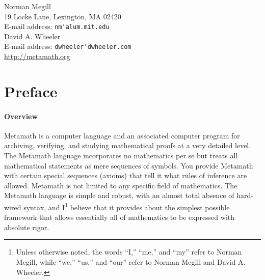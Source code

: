 \begin{center}
\hfill
\vfill

Norman Megill\\ 19 Locke Lane, Lexington, MA 02420 \\
E-mail address: \texttt{nm{\char`\@}alum.mit.edu} \\
\vspace{7ex}
David A. Wheeler \\
E-mail address: \texttt{dwheeler{\char`\@}dwheeler.com} \\
\vspace{7ex}
\url{http://metamath.org}
\end{center}

%
%
%
%

\tableofcontents

\chapter*{Preface}



\subsubsection{Overview}

Metamath is a computer language and an associated computer
program for archiving, verifying, and studying mathematical proofs at a very
detailed level.  The Metamath language incorporates no mathematics per se but
treats all mathematical statements as mere sequences of symbols.  You provide
Metamath with certain special sequences (axioms) that tell it what rules
of inference are allowed.  Metamath is not limited to any specific field of
mathematics.  The Metamath language is simple and robust, with an
almost total absence of hard-wired syntax, and
I\footnote{Unless otherwise noted, the words
``I,'' ``me,'' and ``my'' refer to Norman Megill, while
``we,'' ``us,'' and ``our'' refer to Norman Megill and
David A. Wheeler.}
believe that it
provides about the simplest possible framework that allows essentially all of
mathematics to be expressed with absolute rigor.

